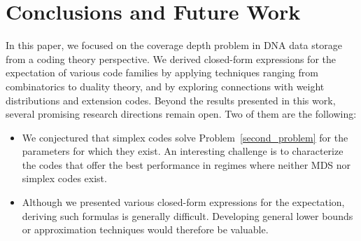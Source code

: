\documentclass[11pt,a4paper,reqno,twoside]{article}
\theoremstyle{definition}
\begin{document}
\section{Conclusions and Future Work}
In this paper, we focused on the coverage depth problem in DNA data storage from a coding theory perspective. We derived closed-form expressions for the expectation of various code families by applying techniques ranging from combinatorics to duality theory, and by exploring connections with weight distributions and extension codes. 
Beyond the results presented in this work, several promising research directions remain open. Two of them are the following:

\begin{itemize}
\item[1.] We conjectured that simplex codes solve Problem~\ref{second_problem} for the parameters for which they exist. An interesting challenge is to characterize the codes that offer the best performance in regimes where neither MDS nor simplex codes exist.
\item[2.] Although we presented various closed-form expressions for the expectation, deriving such formulas is generally difficult. Developing general lower bounds or approximation techniques would therefore be valuable. 
\end{itemize} 

\medskip
\end{document}
